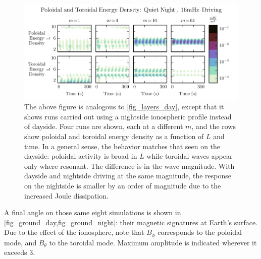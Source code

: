 \documentclass[draft,linenumbers]{agujournal}
\begin{document}
\begin{figure}
    \begin{center}
    \includegraphics[width=\textwidth]{figures/fig_layers_night.pdf}
    \caption{
        The above figure is analogous to \cref{fig_layers_day}, except that it shows runs carried out using a nightside ionospheric profile instead of dayside. Four runs are shown, each at a different $m$, and the rows show poloidal and toroidal energy density as a function of $L$ and time. In a general sense, the behavior matches that seen on the dayside: poloidal activity is broad in $L$ while toroidal waves appear only where resonant. The difference is in the wave magnitude. With dayside and nightside driving at the same magnitude, the response on the nightside is smaller by an order of magnitude due to the increased Joule dissipation.
    }
    \label{fig_layers_night}
    \end{center}
\end{figure}

A final angle on those same eight simulations is shown in \cref{fig_ground_day,fig_ground_night}: their magnetic signatures at Earth's surface. Due to the effect of the ionosphere, note that $B_\phi$ corresponds to the poloidal mode, and $B_\theta$ to the toroidal mode. Maximum amplitude is indicated wherever it exceeds \SI{3}{\nT}.
\end{document}
